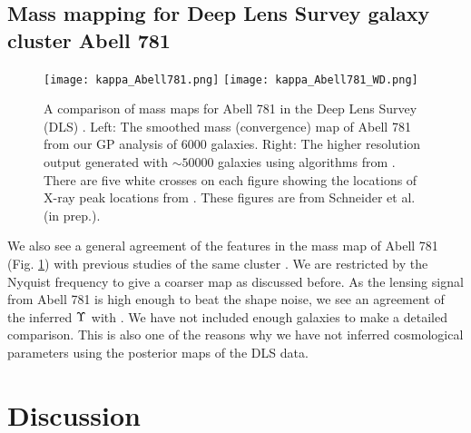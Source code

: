 \subsection{Mass mapping for Deep Lens Survey galaxy cluster Abell 781}
\begin{figure}[h!]
	\centering
	\texttt{[image: kappa\_Abell781.png]}
	\texttt{[image: kappa\_Abell781\_WD.png]}
	\caption{A comparison of mass maps for Abell 781 in the Deep Lens Survey (DLS) 
		\label{fig:Abell781_massmap}.  Left: The smoothed mass (convergence) map of Abell 781 from 
		our GP analysis of 6000 galaxies.
		Right: The higher resolution output generated with $\sim 50000$ galaxies using 
		algorithms from \cite{Wittman2014}. 
		There are five white crosses on each figure showing the locations of X-ray
		peak locations from \cite{Sehgal2008}. 
	These figures are from Schneider et al. (in prep.).
}
\end{figure}
We also see a general agreement of the features in the mass map of Abell 781
(Fig. \ref{fig:Abell781_massmap}) with previous studies of the same cluster 
\citep{Wittman2014}.  
We are restricted by the Nyquist frequency to give a coarser map as discussed
before.   
As the lensing signal from Abell 781 is high enough to beat the shape noise, 
we see an agreement of the inferred $\Upsilon$ with \cite{Wittman2014}. 
We have not included enough galaxies to make a detailed comparison. 
This is also one of the reasons why  we
 have not inferred cosmological parameters using the
posterior maps of the DLS data.



\section{Discussion}

